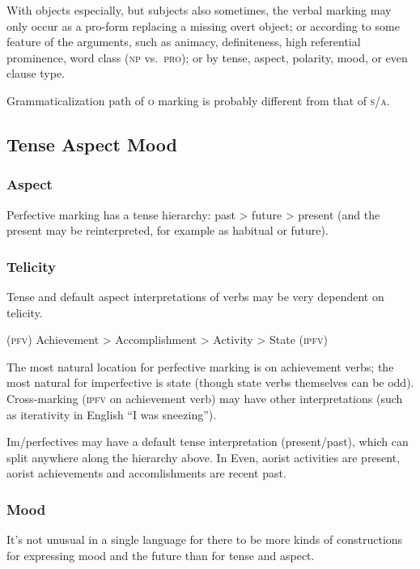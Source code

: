 \documentclass[11pt]{article}
\newcommand{\I}[1]{\textsc{#1}}   %
\begin{document}
With objects especially, but subjects also sometimes, the verbal
marking may only occur as a pro-form replacing a missing overt object;
or according to some feature of the arguments, such as animacy,
definiteness, high referential prominence, word class (\I{np}
vs.\ \I{pro}); or by tense, aspect, polarity, mood, or even clause
type.

Grammaticalization path of \I{o} marking is probably different from
that of \I{s/a}.


\subsection{Tense Aspect Mood}

\subsubsection{Aspect} Perfective marking has a tense hierarchy: past
> future > present (and the present may be reinterpreted, for example
as habitual or future).

\subsubsection{Telicity}
Tense and default aspect interpretations of verbs may be very
dependent on telicity.
\begin{center}
  \I{(pfv)} Achievement > Accomplishment > Activity > State \I{(ipfv)}
\end{center}
\noindent The most natural location for perfective marking is on
achievement verbs; the most natural for imperfective is state (though
state verbs themselves can be odd).  Cross-marking (\I{ipfv} on
achievement verb) may have other interpretations (such as iterativity
in English ``I was sneezing'').

Im/perfectives may have a default tense interpretation (present/past),
which can split anywhere along the hierarchy above.  In Even, aorist
activities are present, aorist achievements and accomlishments are
recent past.

\subsubsection{Mood}
It's not unusual in a single language for there to be more kinds of
constructions for expressing mood and the future than for tense and
aspect.
\end{document}

